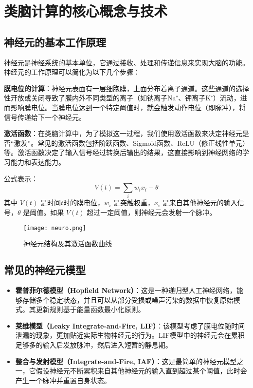 \documentclass[a4paper,12pt]{article}
\begin{document}
\section{类脑计算的核心概念与技术}
\subsection{神经元的基本工作原理}

神经元是神经系统的基本单位，它通过接收、处理和传递信息来实现大脑的功能。神经元的工作原理可以简化为以下几个步骤：

\textbf{膜电位的计算}：神经元表面有一层细胞膜，上面分布着离子通道。这些通道的选择性开放或关闭导致了膜内外不同类型的离子（如钠离子Na⁺、钾离子K⁺）流动，进而影响膜电位。当膜电位达到一个特定阈值时，就会触发动作电位（即脉冲），将信号传递给下一个神经元。

\textbf{激活函数}：在类脑计算中，为了模拟这一过程，我们使用激活函数来决定神经元是否“激发”。常见的激活函数包括阶跃函数、Sigmoid函数、ReLU（修正线性单元）等。激活函数决定了输入信号经过转换后输出的结果，这直接影响到神经网络的学习能力和表达能力。

公式表示：
\begin{equation}
V(t) = \sum_{i} w_i x_i - \theta
\end{equation}
其中 $V(t)$ 是时间$t$时的膜电位，$w_i$ 是突触权重，$x_i$ 是来自其他神经元的输入信号，$\theta$ 是阈值。如果 $V(t)$ 超过一定阈值，则神经元会发射一个脉冲。

\begin{figure}[h]
    \centering
   \texttt{[image: neuro.png]}
    \caption{神经元结构及其激活函数曲线}
    \label{fig:neuron_diagram}
\end{figure}

\subsection{常见的神经元模型}

\begin{itemize}
    \item \textbf{霍普菲尔德模型（Hopfield Network）}\cite{hopfield2007hopfield}：这是一种递归型人工神经网络，能够存储多个稳定状态，并且可以从部分受损或噪声污染的数据中恢复原始模式。其更新规则基于能量函数最小化原则。
    \item \textbf{莱维模型（Leaky Integrate-and-Fire, LIF）}\cite{teeter2018generalized}：该模型考虑了膜电位随时间泄漏的现象，更加贴近实际生物神经元的行为。LIF模型中的神经元会在累积足够多的输入后发放脉冲，然后进入短暂的静息期。
    \item \textbf{整合与发射模型（Integrate-and-Fire, IAF）}\cite{burkitt2006review}：这是最简单的神经元模型之一，它假设神经元不断累积来自其他神经元的输入直到超过某个阈值，此时会产生一个脉冲并重置自身状态。
\end{itemize}
\end{document}
